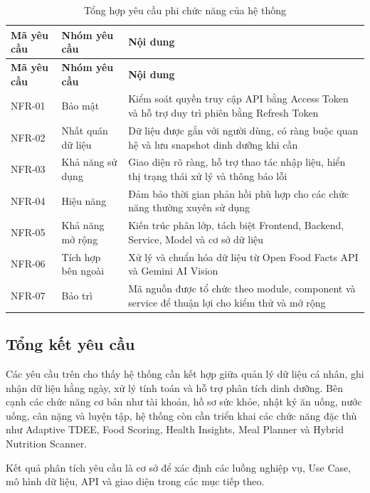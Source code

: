 \documentclass[12pt, a4paper]{report}
\begin{document}
\begin{longtable}{|>{\raggedright\arraybackslash}p{4cm}|>{\raggedright\arraybackslash}p{4cm}|p{7cm}|}
\caption{Tổng hợp yêu cầu phi chức năng của hệ thống} \label{tab:tong_hop_phi_chuc_nang_2} \\
\hline
\textbf{Mã yêu cầu} & \textbf{Nhóm yêu cầu} & \textbf{Nội dung} \\
\hline
\endfirsthead
\hline
\textbf{Mã yêu cầu} & \textbf{Nhóm yêu cầu} & \textbf{Nội dung} \\
\hline
\endhead

NFR-01 & Bảo mật & Kiểm soát quyền truy cập API bằng Access Token và hỗ trợ duy trì phiên bằng Refresh Token \\
\hline
NFR-02 & Nhất quán dữ liệu & Dữ liệu được gắn với người dùng, có ràng buộc quan hệ và lưu snapshot dinh dưỡng khi cần \\
\hline
NFR-03 & Khả năng sử dụng & Giao diện rõ ràng, hỗ trợ thao tác nhập liệu, hiển thị trạng thái xử lý và thông báo lỗi \\
\hline
NFR-04 & Hiệu năng & Đảm bảo thời gian phản hồi phù hợp cho các chức năng thường xuyên sử dụng \\
\hline
NFR-05 & Khả năng mở rộng & Kiến trúc phân lớp, tách biệt Frontend, Backend, Service, Model và cơ sở dữ liệu \\
\hline
NFR-06 & Tích hợp bên ngoài & Xử lý và chuẩn hóa dữ liệu từ Open Food Facts API và Gemini AI Vision \\
\hline
NFR-07 & Bảo trì & Mã nguồn được tổ chức theo module, component và service để thuận lợi cho kiểm thử và mở rộng \\
\hline
\end{longtable}

\subsection{Tổng kết yêu cầu}Các yêu cầu trên cho thấy hệ thống cần kết hợp giữa quản lý dữ liệu cá nhân, ghi nhận dữ liệu hằng ngày, xử lý tính toán và hỗ trợ phân tích dinh dưỡng. Bên cạnh các chức năng cơ bản như tài khoản, hồ sơ sức khỏe, nhật ký ăn uống, nước uống, cân nặng và luyện tập, hệ thống còn cần triển khai các chức năng đặc thù như Adaptive TDEE, Food Scoring, Health Insights, Meal Planner và Hybrid Nutrition Scanner.

Kết quả phân tích yêu cầu là cơ sở để xác định các luồng nghiệp vụ, Use Case, mô hình dữ liệu, API và giao diện trong các mục tiếp theo.
\end{document}

